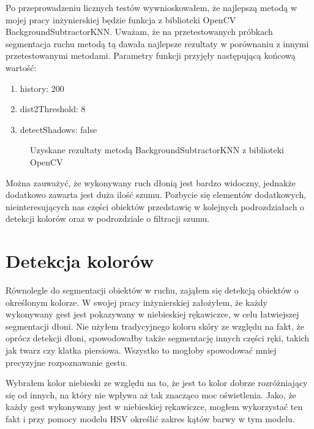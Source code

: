 \documentclass[a4paper,12pt,twoside,openany]{report}
\newcommand{\ImgPath}{.}
\begin{document}
Po przeprowadzeniu licznych testów wywnioskowałem, że najlepszą metodą w mojej pracy inżynierskiej będzie funkcja z biblioteki OpenCV BackgroundSubtractorKNN. Uważam, że na przetestowanych próbkach segmentacja ruchu metodą tą dawała najlepsze rezultaty w porównaniu z innymi przetestowanymi metodami. Parametry funkcji przyjęły następującą końcową wartość:
\begin{enumerate}
	\item history: 200
	\item dist2Threshold: 8
	\item detectShadows: false
\end{enumerate}

\begin{figure}[H]
	\centering
	\caption{Uzyskane rezultaty metodą BackgroundSubtractorKNN z biblioteki OpenCV}
\end{figure}


Można zauważyć, że wykonywany ruch dłonią jest bardzo widoczny, jednakże dodatkowo zawarta jest duża ilość szumu. Pozbycie się elementów dodatkowych, nieinteresujących nas części obiektów przedstawię w kolejnych podrozdziałach o detekcji kolorów oraz w podrozdziale o filtracji szumu. 

\section{Detekcja kolorów}
Równolegle do segmentacji obiektów w ruchu, zająłem się detekcją obiektów o określonym kolorze. W swojej pracy inżynierskiej założyłem, że każdy wykonywany gest jest pokazywany w niebieskiej rękawiczce, w celu łatwiejszej segmentacji dłoni. Nie użyłem tradycyjnego koloru skóry ze względu na fakt, że oprócz detekcji dłoni, spowodowałby także segmentację innych części ręki, takich jak twarz czy klatka piersiowa. Wszystko to mogłoby spowodować mniej precyzyjne rozpoznawanie gestu.

Wybrałem kolor niebieski ze względu na to, że jest to kolor dobrze rozróżniający się od innych, na który nie wpływa aż tak znacząco moc oświetlenia.
Jako, że każdy gest wykonywany jest w niebieskiej rękawiczce, mogłem wykorzystać ten fakt i przy pomocy modelu HSV określić zakres kątów barwy w tym modelu. 
\end{document}

